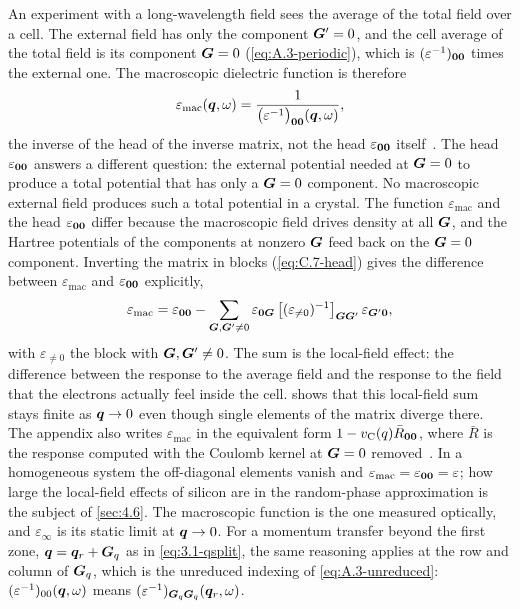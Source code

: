 An experiment with a long-wavelength field sees the average of the total field over a cell. The external field has only the component $\bm{G}' = 0$, and the cell average of the total field is its component $\bm{G} = 0$ (\cref{eq:A.3-periodic}), which is $(\varepsilon^{-1})_{\bm{0}\bm{0}}$ times the external one. The macroscopic dielectric function is therefore
\begin{equation}
  \varepsilon_{\mathrm{mac}}(\bm{q},\omega) = \frac{1}{\bigl(\varepsilon^{-1}\bigr)_{\bm{0}\bm{0}}(\bm{q},\omega)} ,
  \label{eq:4.4-epsmac}
\end{equation}
the inverse of the head of the inverse matrix, not the head $\varepsilon_{\bm{0}\bm{0}}$ itself~\cite{adler1962quantum,wiser1963dielectric}. The head $\varepsilon_{\bm{0}\bm{0}}$ answers a different question: the external potential needed at $\bm{G} = 0$ to produce a total potential that has only a $\bm{G} = 0$ component. No macroscopic external field produces such a total potential in a crystal. The function $\varepsilon_{\mathrm{mac}}$ and the head $\varepsilon_{\bm{0}\bm{0}}$ differ because the macroscopic field drives density at all $\bm{G}$, and the Hartree potentials of the components at nonzero $\bm{G}$ feed back on the $\bm{G} = 0$ component. Inverting the matrix in blocks (\cref{eq:C.7-head}) gives the difference between $\varepsilon_{\mathrm{mac}}$ and $\varepsilon_{\bm{0}\bm{0}}$ explicitly,
\begin{equation*}
  \varepsilon_{\mathrm{mac}} = \varepsilon_{\bm{0}\bm{0}} - \sum_{\bm{G},\bm{G}'\ne0}\varepsilon_{\bm{0}\bm{G}}\,\bigl[(\varepsilon_{\ne0})^{-1}\bigr]_{\bm{G}\bm{G}'}\,\varepsilon_{\bm{G}'\bm{0}} ,
\end{equation*}
with $\varepsilon_{\ne0}$ the block with $\bm{G},\bm{G}' \ne 0$. The sum is the local-field effect: the difference between the response to the average field and the response to the field that the electrons actually feel inside the cell.  shows that this local-field sum stays finite as $\bm{q} \to 0$ even though single elements of the matrix diverge there. The appendix also writes $\varepsilon_{\mathrm{mac}}$ in the equivalent form $1 - v_{\mathrm{C}}(q)\bar R_{\bm{0}\bm{0}}$, where $\bar R$ is the response computed with the Coulomb kernel at $\bm{G} = 0$ removed~\cite{onida2002electronic}. In a homogeneous system the off-diagonal elements vanish and $\varepsilon_{\mathrm{mac}} = \varepsilon_{\bm{0}\bm{0}} = \varepsilon$; how large the local-field effects of silicon are in the random-phase approximation is the subject of \cref{sec:4.6}. The macroscopic function is the one measured optically, and $\varepsilon_\infty$ is its static limit at $\bm{q} \to 0$. For a momentum transfer beyond the first zone, $\bm{q} = \bm{q}_r + \bm{G}_q$ as in \cref{eq:3.1-qsplit}, the same reasoning applies at the row and column of $\bm{G}_q$, which is the unreduced indexing of \cref{eq:A.3-unreduced}: $(\varepsilon^{-1})_{00}(\bm{q},\omega)$ means $(\varepsilon^{-1})_{\bm{G}_q\bm{G}_q}(\bm{q}_r,\omega)$.


